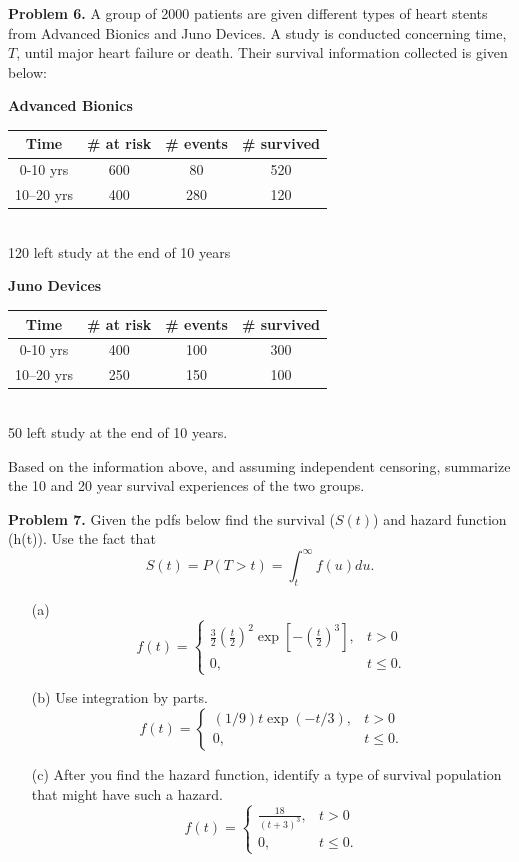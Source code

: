 \documentclass[12pt]{article}
\begin{document}
\textbf{Problem 6.}
A group of 2000 patients are given different types of heart stents from Advanced Bionics and Juno Devices. A study is conducted concerning time, $T$, until major heart failure or death. Their survival information collected is given below:
\begin{center}
\textbf{Advanced Bionics}
\begin{tabular}{ c c c c }
 Time & \# at risk & \# events & \# survived \\ \hline
 0-10 yrs & 600 & 80 & 520 \\
 10–20 yrs &  400 & 280 & 120
\end{tabular} \\
120 left study at the end of 10 years
\end{center}
\begin{center}
\textbf{Juno Devices}
\begin{tabular}{ c c c c }
 Time & \# at risk & \# events & \# survived \\ \hline
 0-10 yrs & 400 & 100 & 300 \\
 10–20 yrs &  250 & 150 & 100
\end{tabular} \\
50 left study at the end of 10 years.
\end{center}
Based on the information above, and assuming independent censoring, summarize the 10 and 20 year survival experiences of the two groups.

\newpage
\textbf{Problem 7.}
Given the pdfs below find the survival ($S(t)$) and hazard function (h(t)). Use the fact that
\[
S(t) = P(T>t) = \int_t^{\infty} f(u) du.
\]

\begin{itemize}
	\item[(a)]
	$$
	f(t) = \begin{cases} \frac{3}{2} (\frac{t}{2})^2 \exp[-(\frac{t}{2})^3], &t > 0 \\
		0, &t \leq 0.
		\end{cases}
	$$
	\item[(b)] Use integration by parts.
	$$
	f(t) = \begin{cases} (1/9)t\exp(-t/3), &t > 0 \\
		0, &t \leq 0.
		\end{cases}
    $$
    \item[(c)] After you find the hazard function, identify a type of survival population that might have such a hazard.
    $$
	f(t) = \begin{cases} \frac{18}{(t+3)^3}, &t > 0 \\
		0, &t \leq 0.
		\end{cases}
    $$
\end{itemize}
\end{document}
